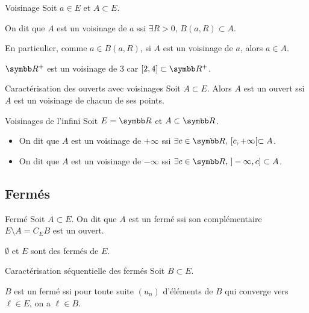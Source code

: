 \begin{definition}{Voisinage}{}
    Soit $a \in E$ et $A \subset E$.

    On dit que $A$ est un voisinage de $a$ ssi
    $\exists R > 0, \, B(a, R) \subset A$.
\end{definition}

\begin{remarque}
    En particulier, comme $a \in B(a, R)$, si $A$ est un voisinage de $a$, alors $a \in A$.
\end{remarque}

\begin{exemple}
    $\R^+$ est un voisinage de $3$ car $[2, 4] \subset \R^+$.
\end{exemple}

\begin{proposition}{Caractérisation des ouverts avec voisinages}{}
    Soit $A \subset E$. Alors $A$ est un ouvert ssi $A$ est un voisinage de chacun de ses points.
\end{proposition}

\begin{proposition}{Voisinages de l'infini}{}
    Soit $E = \R$ et $A \subset \R$.
    \begin{itemize}
        \item On dit que $A$ est un voisinage de $+\infty$
        ssi $\exists c \in \R, \, [c, +\infty[ \subset A$. 

        \item On dit que $A$ est un voisinage de $-\infty$ ssi 
        $\exists c \in \R, \, ]-\infty, c] \subset A$.
    \end{itemize}
\end{proposition}

\subsection{Fermés}

\begin{definition}{Fermé}{}
    Soit $A \subset E$.
    On dit que $A$ est un fermé ssi son complémentaire 
    $E \setminus A = C_E B$ est un ouvert.
\end{definition}

\begin{exemple}
    $\emptyset$ et $E$ sont des fermés de $E$. 
\end{exemple}

\begin{theoreme}{Caractérisation séquentielle des fermés}{}
    Soit $B \subset E$.
    
    $B$ est un fermé ssi pour toute suite $(u_n)$ d'éléments de $B$ qui converge 
    vers $\ell \in E$, on a $\ell \in B$.
\end{theoreme}

